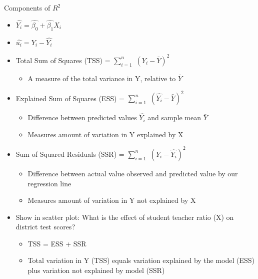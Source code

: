 \documentclass[
  8pt,
  ignorenonframetext,
  dvipsnames]{beamer}
\providecommand{\tightlist}{%
  \setlength{\itemsep}{0pt}\setlength{\parskip}{0pt}}
\let\olditem\item
\renewcommand{\item}{%
  \olditem\vspace{4pt}
}
\begin{document}
\begin{frame}{Components of \(R^2\)}
\protect\hypertarget{components-of-r2}{}

\begin{itemize}
\item
  \(\hat{Y_i} = \hat{\beta_0} + \hat{\beta_1}X_i\)
\item
  \(\hat{u_i} = Y_i - \hat{Y_i}\)
\end{itemize}

\medskip

\begin{itemize}
\tightlist
\item
  Total Sum of Squares (TSS) = \(\sum_{i=1}^{n}\) \((Y_i-\bar{Y})^2\)

  \begin{itemize}
  \tightlist
  \item
    A measure of the total variance in Y, relative to \(\bar{Y}\)
  \end{itemize}
\item
  Explained Sum of Squares (ESS) = \(\sum_{i=1}^{n}\)
  \((\hat{Y_i}-\bar{Y})^2\)

  \begin{itemize}
  \tightlist
  \item
    Difference between predicted values \(\hat{Y_i}\) and sample mean
    \(\bar{Y}\)
  \item
    Measures amount of variation in Y explained by X
  \end{itemize}
\item
  Sum of Squared Residuals (SSR) = \(\sum_{i=1}^{n}\)
  \((Y_i- \hat{Y_i})^2\)

  \begin{itemize}
  \tightlist
  \item
    Difference between actual value observed and predicted value by our
    regression line
  \item
    Measures amount of variation in Y not explained by X
  \end{itemize}
\end{itemize}

\medskip

\begin{itemize}
\tightlist
\item
  Show in scatter plot: What is the effect of student teacher ratio (X)
  on district test scores?

  \begin{itemize}
  \tightlist
  \item
    TSS = ESS + SSR
  \item
    Total variation in Y (TSS) equals variation explained by the model
    (ESS) plus variation not explained by model (SSR)
  \end{itemize}
\end{itemize}

\end{frame}
\end{document}
